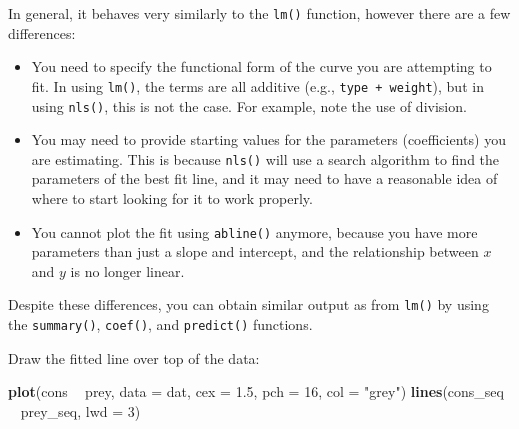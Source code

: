 \documentclass[]{book}
\newenvironment{Shaded}{\begin{snugshade}}{\end{snugshade}}
\newcommand{\DataTypeTok}[1]{\textcolor[rgb]{0.13,0.29,0.53}{#1}}
\newcommand{\DecValTok}[1]{\textcolor[rgb]{0.00,0.00,0.81}{#1}}
\newcommand{\FloatTok}[1]{\textcolor[rgb]{0.00,0.00,0.81}{#1}}
\newcommand{\KeywordTok}[1]{\textcolor[rgb]{0.13,0.29,0.53}{\textbf{#1}}}
\newcommand{\NormalTok}[1]{#1}
\newcommand{\OperatorTok}[1]{\textcolor[rgb]{0.81,0.36,0.00}{\textbf{#1}}}
\newcommand{\StringTok}[1]{\textcolor[rgb]{0.31,0.60,0.02}{#1}}
\providecommand{\tightlist}{%
  \setlength{\itemsep}{0pt}\setlength{\parskip}{0pt}}
\begin{document}
In general, it behaves very similarly to the \texttt{lm()} function, however there are a few differences:

\begin{itemize}
\tightlist
\item
  You need to specify the functional form of the curve you are attempting to fit. In using \texttt{lm()}, the terms are all additive (e.g., \texttt{type\ +\ weight}), but in using \texttt{nls()}, this is not the case. For example, note the use of division.
\item
  You may need to provide starting values for the parameters (coefficients) you are estimating. This is because \texttt{nls()} will use a search algorithm to find the parameters of the best fit line, and it may need to have a reasonable idea of where to start looking for it to work properly.
\item
  You cannot plot the fit using \texttt{abline()} anymore, because you have more parameters than just a slope and intercept, and the relationship between \(x\) and \(y\) is no longer linear.
\end{itemize}

Despite these differences, you can obtain similar output as from \texttt{lm()} by using the \texttt{summary()}, \texttt{coef()}, and \texttt{predict()} functions.

\begin{Shaded}
\end{Shaded}

Draw the fitted line over top of the data:

\begin{Shaded}
\begin{Highlighting}[]
\KeywordTok{plot}\NormalTok{(cons }\OperatorTok{~}\StringTok{ }\NormalTok{prey, }\DataTypeTok{data =}\NormalTok{ dat, }\DataTypeTok{cex =} \FloatTok{1.5}\NormalTok{, }\DataTypeTok{pch =} \DecValTok{16}\NormalTok{, }\DataTypeTok{col =} \StringTok{"grey"}\NormalTok{)}
\KeywordTok{lines}\NormalTok{(cons_seq }\OperatorTok{~}\StringTok{ }\NormalTok{prey_seq, }\DataTypeTok{lwd =} \DecValTok{3}\NormalTok{)}
\end{Highlighting}
\end{Shaded}
\end{document}
